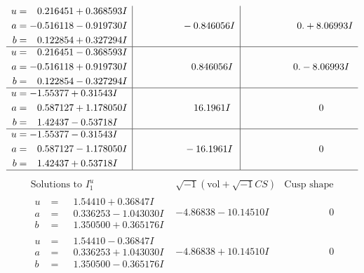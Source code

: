 \documentclass[1p]{elsarticle_modified}
\theoremstyle{definition}
\newcommand{\I}{\sqrt{-1}}
\begin{document}
$$\begin{array}{c|c|c}
\begin{aligned}
u &= \phantom{-}0.216451 + 0.368593 I \\
a &= -0.516118 - 0.919730 I \\
b &= \phantom{-}0.122854 + 0.327294 I\end{aligned}
 & \phantom{-0.000000 } -0.846056 I & \phantom{-0.000000 -}0. + 8.06993 I \\ \hline\begin{aligned}
u &= \phantom{-}0.216451 - 0.368593 I \\
a &= -0.516118 + 0.919730 I \\
b &= \phantom{-}0.122854 - 0.327294 I\end{aligned}
 & \phantom{-0.000000 -}0.846056 I & \phantom{-0.000000 } 0. - 8.06993 I \\ \hline\begin{aligned}
u &= -1.55377 + 0.31543 I \\
a &= \phantom{-}0.587127 + 1.178050 I \\
b &= \phantom{-}1.42437 - 0.53718 I\end{aligned}
 & \phantom{-0.000000 -}16.1961 I & \phantom{-0.000000 } 0 \\ \hline\begin{aligned}
u &= -1.55377 - 0.31543 I \\
a &= \phantom{-}0.587127 - 1.178050 I \\
b &= \phantom{-}1.42437 + 0.53718 I\end{aligned}
 & \phantom{-0.000000 } -16.1961 I & \phantom{-0.000000 } 0\\
 \hline 
 \end{array}$$\newpage$$\begin{array}{c|c|c}  
\text{Solutions to }I^u_{1}& \I (\text{vol} + \sqrt{-1}CS) & \text{Cusp shape}\\
 \hline 
\begin{aligned}
u &= \phantom{-}1.54410 + 0.36847 I \\
a &= \phantom{-}0.336253 - 1.043030 I \\
b &= \phantom{-}1.350500 + 0.365176 I\end{aligned}
 & -4.86838 - 10.14510 I & \phantom{-0.000000 } 0 \\ \hline\begin{aligned}
u &= \phantom{-}1.54410 - 0.36847 I \\
a &= \phantom{-}0.336253 + 1.043030 I \\
b &= \phantom{-}1.350500 - 0.365176 I\end{aligned}
 & -4.86838 + 10.14510 I & \phantom{-0.000000 } 0 \\ \hline\begin{aligned}

\end{aligned}
\end{array}$$
\end{document}
